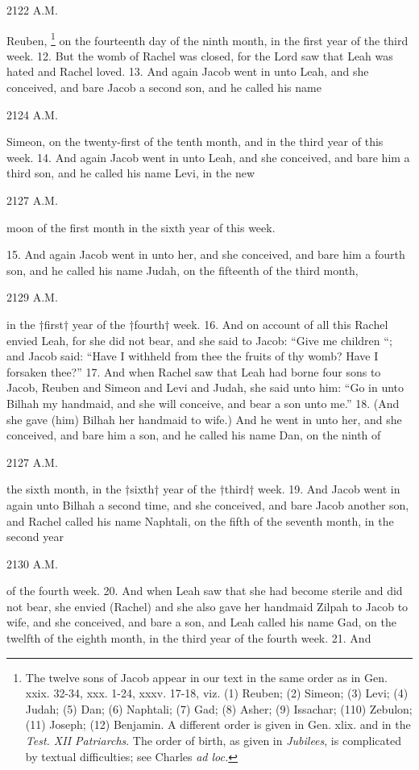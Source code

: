2122 A.M.

Reuben, \footnote{The twelve sons of Jacob appear in our text in the same order as in Gen. xxix. 32-34, xxx. 1-24, xxxv. 17-18, viz. (1) Reuben; (2) Simeon; (3) Levi; (4) Judah; (5) Dan; (6) Naphtali; (7) Gad; (8) Asher; (9) Issachar; (110) Zebulon; (11) Joseph; (12) Benjamin. A different order is given in Gen. xlix. and in the \emph{Test. XII Patriarchs}. The order of birth, as given in \emph{Jubilees}, is complicated by textual difficulties; see Charles \emph{ad loc.}} on the fourteenth day of the ninth month, in the first year of the third week. 12. But the womb of Rachel was closed, for the Lord saw that Leah was hated and Rachel loved. 13. And again Jacob went in unto Leah, and she conceived, and bare Jacob a second son, and he called his name

2124 A.M.

Simeon, on the twenty-first of the tenth month, and in the third year of this week. 14. And again Jacob went in unto Leah, and she conceived, and bare him a third son, and he called his name Levi, in the new

2127 A.M.

moon of the first month in the sixth year of this week.

15. And again Jacob went in unto her, and she conceived, and bare him a fourth son, and he called his name Judah, on the fifteenth of the third month,

2129 A.M.

in the †first† year of the †fourth† week. 16. And on account of all this Rachel envied Leah, for she did not bear, and she said to Jacob: ``Give me children ``; and Jacob said: ``Have I withheld from thee the fruits of thy womb? Have I forsaken thee?'' 17. And when Rachel saw that Leah had borne four sons to Jacob, Reuben and Simeon and Levi and Judah, she said unto him: ``Go in unto Bilhah my handmaid, and she will conceive, and bear a son unto me.'' 18. (And she gave (him) Bilhah her handmaid to wife.) And he went in unto her, and she conceived, and bare him a son, and he called his name Dan, on the ninth of

2127 A.M.

the sixth month, in the †sixth† year of the †third† week. 19. And Jacob went in again unto Bilhah a second time, and she conceived, and bare Jacob another son, and Rachel called his name Naphtali, on the fifth of the seventh month, in the second year

2130 A.M.

of the fourth week. 20. And when Leah saw that she had become sterile and did not bear, she envied (Rachel) and she also gave her handmaid Zilpah to Jacob to wife, and she conceived, and bare a son, and Leah called his name Gad, on the twelfth of the eighth month, in the third year of the fourth week. 21. And

